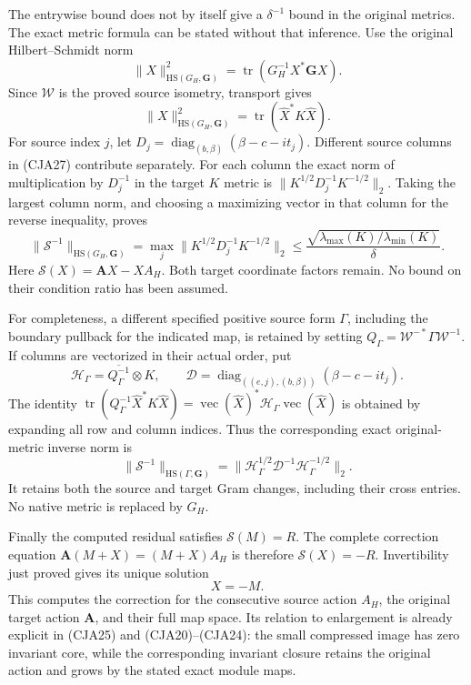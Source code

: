 The entrywise bound does not by itself give a
\(\delta^{-1}\) bound in the original metrics.
The exact metric formula can be stated without that inference.
Use the original Hilbert--Schmidt norm
\[
 \|X\|_{\mathrm{HS}(G_H,\mathbf G)}^2
 =\operatorname{tr}(G_H^{-1}X^*\mathbf GX).
 \]
Since \(\mathcal W\) is the proved source isometry, transport gives
\begin{equation}
 \|X\|_{\mathrm{HS}(G_H,\mathbf G)}^2
      =\operatorname{tr}(\widehat X^*K\widehat X).
 \tag{CJA27}
\end{equation}
For source index \(j\), let
\(D_j=\operatorname{diag}_{(b,\beta)}(\beta-c-it_j)\).
Different source columns in (CJA27) contribute separately.
For each column the exact norm of multiplication by \(D_j^{-1}\)
in the target \(K\) metric is
\(\|K^{1/2}D_j^{-1}K^{-1/2}\|_2\).
Taking the largest column norm, and choosing a maximizing vector
in that column for the reverse inequality, proves
\begin{equation}
 \boxed{\|\mathscr S^{-1}\|_{\mathrm{HS}(G_H,\mathbf G)}
 =\max_j\|K^{1/2}D_j^{-1}K^{-1/2}\|_2
 \leq\frac{\sqrt{\lambda_{\max}(K)/\lambda_{\min}(K)}}{\delta}.}
 \tag{CJA28}
\end{equation}
Here \(\mathscr S(X)=\mathbf AX-XA_H\).
Both target coordinate factors remain.
No bound on their condition ratio has been assumed.

For completeness, a different specified positive source form
\(\Gamma\), including the boundary pullback for the indicated map, is retained
by setting
\(Q_\Gamma=\mathcal W^{-*}\Gamma\mathcal W^{-1}\).
If columns are vectorized in their actual order, put
\[
 \mathcal H_\Gamma=\overline{Q_\Gamma^{-1}}\otimes K,\qquad
 \mathcal D=\operatorname{diag}_{((e,j),(b,\beta))}
                         (\beta-c-it_j).
 \]
The identity
\(\operatorname{tr}(Q_\Gamma^{-1}\widehat X^*K\widehat X)
=\operatorname{vec}(\widehat X)^*
 \mathcal H_\Gamma\operatorname{vec}(\widehat X)\)
is obtained by expanding all row and column indices.
Thus the corresponding exact original-metric inverse norm is
\begin{equation}
 \|\mathscr S^{-1}\|_{\mathrm{HS}(\Gamma,\mathbf G)}
 =\|\mathcal H_\Gamma^{1/2}\mathcal D^{-1}
             \mathcal H_\Gamma^{-1/2}\|_2 .
 \tag{CJA29}
\end{equation}
It retains both the source and target Gram changes, including
their cross entries.  No native metric is replaced by \(G_H\).

Finally the computed residual satisfies \(\mathscr S(M)=R\).
The complete correction equation
\(\mathbf A(M+X)=(M+X)A_H\) is therefore
\(\mathscr S(X)=-R\).
Invertibility just proved gives its unique solution
\begin{equation}
 \boxed{X=-M.}
 \tag{CJA30}
\end{equation}
This computes the correction for the consecutive source action \(A_H\),
the original target action \(\mathbf A\), and their full map space.
Its relation to enlargement is already explicit in (CJA25) and
(CJA20)--(CJA24): the small compressed image has zero invariant core,
while the corresponding invariant closure retains the original action
and grows by the stated exact module maps.

